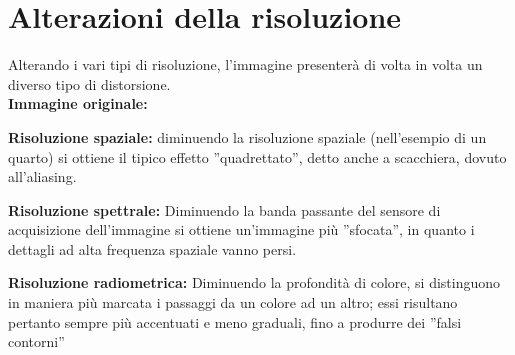 \section{Alterazioni della risoluzione}
Alterando i vari tipi di risoluzione, l’immagine presenterà di volta in
volta un diverso tipo di distorsione.
\\ \textbf{Immagine originale:}
\begin{trivlist}
    \item \textbf{Risoluzione spaziale:} diminuendo la risoluzione spaziale
    (nell’esempio di un quarto) si ottiene il tipico effetto
    ”quadrettato”, detto anche a scacchiera, dovuto all’aliasing.
    \item \textbf{Risoluzione spettrale:} Diminuendo la banda passante del
    sensore di acquisizione dell’immagine si ottiene un’immagine
    più ”sfocata”, in quanto i dettagli ad alta frequenza spaziale
    vanno persi.
    \item \textbf{Risoluzione radiometrica:} Diminuendo la profondità di
    colore, si distinguono in maniera più marcata i passaggi da un
    colore ad un altro; essi risultano pertanto sempre più
    accentuati e meno graduali, fino a produrre dei ”falsi contorni”
\end{trivlist}

